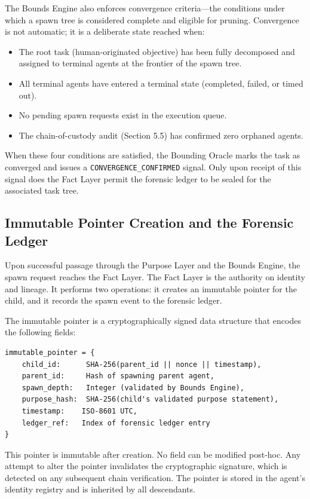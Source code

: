 The Bounds Engine also enforces convergence criteria—the conditions under which a spawn tree is considered complete and eligible for pruning. Convergence is not automatic; it is a deliberate state reached when:

\begin{itemize}
    \item The root task (human-originated objective) has been fully decomposed and assigned to terminal agents at the frontier of the spawn tree.
    \item All terminal agents have entered a terminal state (completed, failed, or timed out).
    \item No pending spawn requests exist in the execution queue.
    \item The chain-of-custody audit (Section 5.5) has confirmed zero orphaned agents.
\end{itemize}

When these four conditions are satisfied, the Bounding Oracle marks the task as converged and issues a \texttt{CONVERGENCE\_CONFIRMED} signal. Only upon receipt of this signal does the Fact Layer permit the forensic ledger to be sealed for the associated task tree.

\subsection{Immutable Pointer Creation and the Forensic Ledger}

Upon successful passage through the Purpose Layer and the Bounds Engine, the spawn request reaches the Fact Layer. The Fact Layer is the authority on identity and lineage. It performs two operations: it creates an immutable pointer for the child, and it records the spawn event to the forensic ledger.

The immutable pointer is a cryptographically signed data structure that encodes the following fields:

\begin{verbatim}
immutable_pointer = {
    child_id:      SHA-256(parent_id || nonce || timestamp),
    parent_id:     Hash of spawning parent agent,
    spawn_depth:   Integer (validated by Bounds Engine),
    purpose_hash:  SHA-256(child's validated purpose statement),
    timestamp:    ISO-8601 UTC,
    ledger_ref:   Index of forensic ledger entry
}
\end{verbatim}

This pointer is immutable after creation. No field can be modified post-hoc. Any attempt to alter the pointer invalidates the cryptographic signature, which is detected on any subsequent chain verification. The pointer is stored in the agent's identity registry and is inherited by all descendants.

